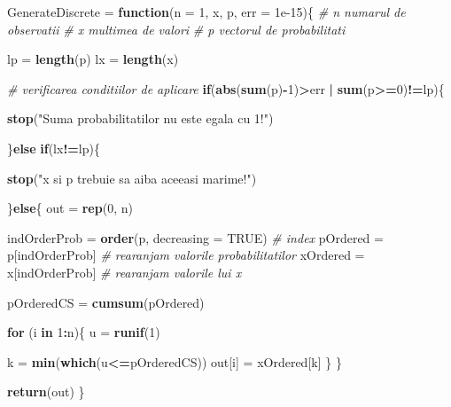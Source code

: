 \documentclass[]{article}
\newenvironment{Shaded}{\begin{snugshade}}{\end{snugshade}}
\newcommand{\CommentTok}[1]{\textcolor[rgb]{0.56,0.35,0.01}{\textit{#1}}}
\newcommand{\ControlFlowTok}[1]{\textcolor[rgb]{0.13,0.29,0.53}{\textbf{#1}}}
\newcommand{\DataTypeTok}[1]{\textcolor[rgb]{0.13,0.29,0.53}{#1}}
\newcommand{\DecValTok}[1]{\textcolor[rgb]{0.00,0.00,0.81}{#1}}
\newcommand{\FloatTok}[1]{\textcolor[rgb]{0.00,0.00,0.81}{#1}}
\newcommand{\KeywordTok}[1]{\textcolor[rgb]{0.13,0.29,0.53}{\textbf{#1}}}
\newcommand{\NormalTok}[1]{#1}
\newcommand{\OperatorTok}[1]{\textcolor[rgb]{0.81,0.36,0.00}{\textbf{#1}}}
\newcommand{\OtherTok}[1]{\textcolor[rgb]{0.56,0.35,0.01}{#1}}
\newcommand{\StringTok}[1]{\textcolor[rgb]{0.31,0.60,0.02}{#1}}
\begin{document}
\begin{Shaded}
\begin{Highlighting}[]
\NormalTok{GenerateDiscrete =}\StringTok{ }\ControlFlowTok{function}\NormalTok{(}\DataTypeTok{n =} \DecValTok{1}\NormalTok{, x, p, }\DataTypeTok{err =} \FloatTok{1e-15}\NormalTok{)\{}
  \CommentTok{# n numarul de observatii}
  \CommentTok{# x multimea de valori}
  \CommentTok{# p vectorul de probabilitati}
  
\NormalTok{  lp =}\StringTok{ }\KeywordTok{length}\NormalTok{(p)}
\NormalTok{  lx =}\StringTok{ }\KeywordTok{length}\NormalTok{(x)}
  
  \CommentTok{# verificarea conditiilor de aplicare }
  \ControlFlowTok{if}\NormalTok{(}\KeywordTok{abs}\NormalTok{(}\KeywordTok{sum}\NormalTok{(p)}\OperatorTok{-}\DecValTok{1}\NormalTok{)}\OperatorTok{>}\NormalTok{err }\OperatorTok{|}\StringTok{ }\KeywordTok{sum}\NormalTok{(p}\OperatorTok{>=}\DecValTok{0}\NormalTok{)}\OperatorTok{!=}\NormalTok{lp)\{}
    
    \KeywordTok{stop}\NormalTok{(}\StringTok{"Suma probabilitatilor nu este egala cu 1!"}\NormalTok{)}
    
\NormalTok{  \}}\ControlFlowTok{else} \ControlFlowTok{if}\NormalTok{(lx}\OperatorTok{!=}\NormalTok{lp)\{}
    
    \KeywordTok{stop}\NormalTok{(}\StringTok{"x si p trebuie sa aiba aceeasi marime!"}\NormalTok{)}
    
\NormalTok{  \}}\ControlFlowTok{else}\NormalTok{\{}
\NormalTok{    out =}\StringTok{ }\KeywordTok{rep}\NormalTok{(}\DecValTok{0}\NormalTok{, n)}
    
\NormalTok{    indOrderProb =}\StringTok{ }\KeywordTok{order}\NormalTok{(p, }\DataTypeTok{decreasing =} \OtherTok{TRUE}\NormalTok{) }\CommentTok{# index}
\NormalTok{    pOrdered =}\StringTok{ }\NormalTok{p[indOrderProb] }\CommentTok{# rearanjam valorile probabilitatilor}
\NormalTok{    xOrdered =}\StringTok{ }\NormalTok{x[indOrderProb] }\CommentTok{# rearanjam valorile lui x}
    
\NormalTok{    pOrderedCS =}\StringTok{ }\KeywordTok{cumsum}\NormalTok{(pOrdered)}
    
    \ControlFlowTok{for}\NormalTok{ (i }\ControlFlowTok{in} \DecValTok{1}\OperatorTok{:}\NormalTok{n)\{}
\NormalTok{      u =}\StringTok{ }\KeywordTok{runif}\NormalTok{(}\DecValTok{1}\NormalTok{)}
      
\NormalTok{      k =}\StringTok{ }\KeywordTok{min}\NormalTok{(}\KeywordTok{which}\NormalTok{(u}\OperatorTok{<=}\NormalTok{pOrderedCS))}
\NormalTok{      out[i] =}\StringTok{ }\NormalTok{xOrdered[k]}
\NormalTok{    \}}
\NormalTok{  \}}
  
  \KeywordTok{return}\NormalTok{(out)}
\NormalTok{\}}
\end{Highlighting}
\end{Shaded}
\end{document}
